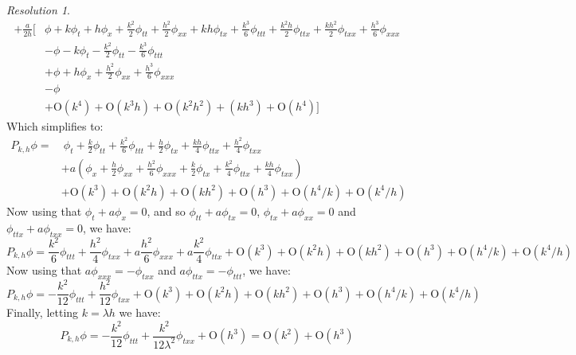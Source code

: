 \documentclass[10pt,a4paper]{article}
\renewcommand{\O}{\mathrm{O}} %
\theoremstyle{definition}
\theoremstyle{remark}
\newtheorem*{res}{Resolution}
\begin{document}
\begin{res}
\begin{align*}
    +\frac{a}{2h}\bigg[            & \phi + k\phi_t + h\phi_x + \frac{k^2}{2}\phi_{tt}+\frac{h^2}{2}\phi_{xx} + kh\phi_{tx} +\frac{k^3}{6}\phi_{ttt}+\frac{k^2h}{2}\phi_{ttx}+\frac{kh^2}{2}\phi_{txx}+\frac{h^3}{6}\phi_{xxx}    \\
                                   & -\phi-k\phi_t-\frac{k^2}{2}\phi_{tt}-\frac{k^3}{6}\phi_{ttt}                                                                                                                                 \\
                                   & +\phi+h\phi_x+\frac{h^2}{2}\phi_{xx}+\frac{h^3}{6}\phi_{xxx}                                                                                                                                 \\
                                   & -\phi                                                                                                                                                                                        \\
                                   & +\O(k^4)+\O(k^3h)+\O(k^2h^2)+(kh^3)+\O(h^4)\bigg]
  \end{align*}
  Which simplifies to:
  \begin{align*}
    P_{k,h}\phi= & \ \phi_t+\frac{k}{2}\phi_{tt}+ \frac{k^2}{6}\phi_{ttt}+ \frac{h}{2}\phi_{tx}+\frac{kh}{4}\phi_{ttx}+\frac{h^2}{4}\phi_{txx}              \\
                 & +a\left(\phi_x+\frac{h}{2}\phi_{xx}+ \frac{h^2}{6}\phi_{xxx}+ \frac{k}{2}\phi_{tx}+\frac{k^2}{4}\phi_{ttx}+\frac{kh}{4}\phi_{txx}\right) \\
                 & +\O{(k^3)}+\O(k^2h)+\O(kh^2)+\O{(h^3)}+\O(h^4/k)+\O(k^4/h)
  \end{align*}
  Now using that $\phi_t+a\phi_x=0$, and so $\phi_{tt}+a\phi_{tx}=0$, $\phi_{tx}+a\phi_{xx}=0$ and $\phi_{ttx}+a\phi_{txx}=0$, we have:
  \begin{equation*}
    P_{k,h}\phi=\frac{k^2}{6}\phi_{ttt}+\frac{h^2}{4}\phi_{txx} +a\frac{h^2}{6}\phi_{xxx}+ a\frac{k^2}{4}\phi_{ttx}+\O(k^3)+\O(k^2h)+\O(kh^2)+\O(h^3)+\O(h^4/k)+\O(k^4/h)
  \end{equation*}
  Now using that $a\phi_{xxx}=-\phi_{txx}$ and $a\phi_{ttx}=-\phi_{ttt}$, we have:
  \begin{equation*}
    P_{k,h}\phi=-\frac{k^2}{12}\phi_{ttt}+\frac{h^2}{12}\phi_{txx} +\O(k^3)+\O(k^2h)+\O(kh^2)+\O(h^3)+\O(h^4/k)+\O(k^4/h)
  \end{equation*}
  Finally, letting $k=\lambda h$ we have:
  \begin{equation*}
    P_{k,h}\phi=-\frac{k^2}{12}\phi_{ttt}+\frac{k^2}{12\lambda^2}\phi_{txx} +\O(h^3)=\O(k^2)+\O(h^3)
  \end{equation*}
\end{res}
\end{document}
